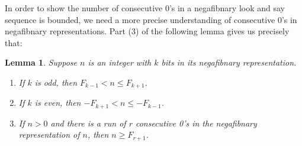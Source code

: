 \documentclass[reqno]{amsart}
\newtheorem{lemma}[theorem]{Lemma}
\theoremstyle{definition}
\begin{document}
In order to show the number of consecutive 0's in a negafibnary look and say sequence is bounded, we need a more precise understanding of consecutive 0's in negafibnary representations. Part (3) of the following lemma gives us precisely that:

\begin{lemma}\label{Lemma::negafibnary props}
    Suppose $n$ is an integer with $k$ bits in its negafibnary representation. 
    \begin{enumerate}
        \item If $k$ is odd, then $F_{k-1}< n\leq F_{k+1}$. 

        \item If $k$ is even, then $-F_{k+1}<n\leq -F_{k-1}$. 

        \item If $n>0$ and there is a run of $r$ consecutive 0's in the negafibnary representation of $n$, then $n\geq F_{r+1}$.
    \end{enumerate} 
\end{lemma}
\end{document}
